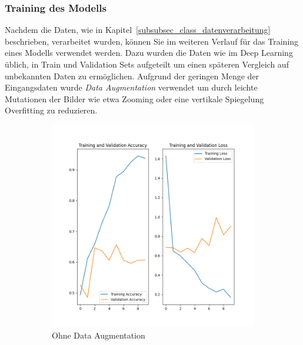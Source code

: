 \subsubsection{Training des Modells}\label{subsubsec_class_training}
Nachdem die Daten, wie in Kapitel~\ref{subsubsec_class_datenverarbeitung} beschrieben, verarbeitet wurden, können Sie im weiteren Verlauf für das Training eines Modells verwendet werden.
Dazu wurden die Daten wie im Deep Learning üblich, in Train und Validation Sets aufgeteilt um einen späteren Vergleich auf unbekannten Daten zu ermöglichen.
Aufgrund der geringen Menge der Eingangsdaten wurde \textit{Data Augmentation} verwendet um durch leichte Mutationen der Bilder wie etwa Zooming oder eine vertikale Spiegelung Overfitting zu reduzieren.
\begin{figure}[H]
    \centering
    \begin{subfigure}[b]{0.49\textwidth}
        \includegraphics[width=\textwidth]{abbildungen/acc_train_val.png}
        \caption{Ohne Data Augmentation}\label{fig:metricsTrainWOAugmentation}
    \end{subfigure}
    \begin{subfigure}[b]{0.49\textwidth}

\end{subfigure}
\end{figure}

